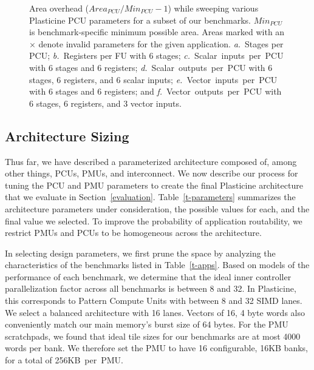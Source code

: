 \begin{figure}
\begin{tabular}{p{0.01cm} p{4.6cm} p{0.01cm} p{4.6cm} p{0.01cm} p{4.6cm} p{0.9cm}}
\end{tabular}
\vspace{-10pt}
\caption{Area overhead ($Area_{PCU}/Min_{PCU} - 1$) while sweeping various Plasticine PCU parameters for a subset of our benchmarks. $Min_{PCU}$ is benchmark-specific minimum possible area. Areas marked with an $\times$ denote invalid parameters for the given application. \emph{a.}~Stages per PCU; \emph{b.}~Registers per FU with 6 stages; \emph{c.}~Scalar~inputs~per~PCU with 6 stages and 6 registers; 
\emph{d.}~Scalar~outputs~per~PCU with 6 stages, 6 registers, and 6 scalar inputs; \emph{e.}~Vector~inputs~per~PCU with 6 stages and 6 registers; and \emph{f.}~Vector~outputs~per~PCU with 6 stages, 6 registers, and 3 vector inputs. }
\label{fig:sizing}
\end{figure}

\subsection{Architecture Sizing}
\label{sizing_section}



Thus far, we have described a parameterized architecture composed of, among other things, PCUs, PMUs, and interconnect.
We now describe our process for tuning the PCU and PMU parameters to create the final Plasticine architecture that we evaluate in Section~\ref{evaluation}.
Table~\ref{t-parameters} summarizes the architecture parameters under consideration, the possible values for each, and the final value we selected.
To improve the probability of application routability, we restrict PMUs and PCUs to be homogeneous across the architecture. 

In selecting design parameters, we first prune the space by analyzing the characteristics of the benchmarks listed in Table~\ref{t-apps}.
Based on models of the performance of each benchmark, we determine that the ideal inner controller parallelization factor across all benchmarks is between 8 and 32.
In Plasticine, this corresponds to Pattern Compute Units with between 8 and 32 SIMD lanes.
We select a balanced architecture with 16 lanes. Vectors of 16, 4 byte words also conveniently match our main memory's burst size of 64 bytes.
For the PMU scratchpads, we found that ideal tile sizes for our benchmarks are at most 4000 words per bank.
We therefore set the PMU to have 16 configurable, 16KB banks, for a total of 256KB~per~PMU.

